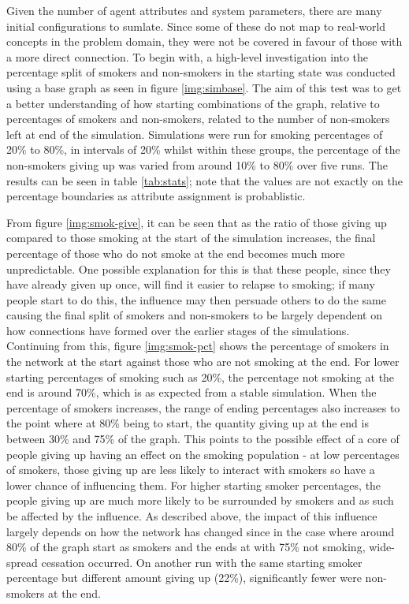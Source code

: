 \documentclass[]{report}
\begin{document}
Given the number of agent attributes and system parameters, there are many initial configurations to sumlate. Since some of these do not map to real-world concepts in the problem domain, they were not be covered in favour of those with a more direct connection. To begin with, a high-level investigation into the percentage split of smokers and non-smokers in the starting state was conducted using a base graph as seen in figure \ref{img:simbase}. The aim of this test was to get a better understanding of how starting combinations of the graph, relative to percentages of smokers and non-smokers, related to the number of non-smokers left at end of the simulation. Simulations were run for smoking percentages of 20\% to 80\%, in intervals of 20\% whilst within these groups, the percentage of the non-smokers giving up was varied from around 10\% to 80\% over five runs. The results can be seen in table \ref{tab:stats}; note that the values are not exactly on the percentage boundaries as attribute assignment is probablistic.


From figure \ref{img:smok-give}, it can be seen that as the ratio of those giving up compared to those smoking at the start of the simulation increases, the final percentage of those who do not smoke at the end becomes much more unpredictable. One possible explanation for this is that these people, since they have already given up once, will find it easier to relapse to smoking; if many people start to do this, the influence may then persuade others to do the same causing the final split of smokers and non-smokers to be largely dependent on how connections have formed over the earlier stages of the simulations. Continuing from this, figure \ref{img:smok-pct} shows the percentage of smokers in the network at the start against those who are not smoking at the end. For lower starting percentages of smoking such as 20\%, the percentage not smoking at the end is around 70\%, which is as expected from a stable simulation. When the percentage of smokers increases, the range of ending percentages also increases to the point where at 80\% being to start, the quantity giving up at the end is between 30\% and 75\% of the graph. This points to the possible effect of a core of people giving up having an effect on the smoking population - at low percentages of smokers, those giving up are less likely to interact with smokers so have a lower chance of influencing them. For higher starting smoker percentages, the people giving up are much more likely to be surrounded by smokers and as such be affected by the influence. As described above, the impact of this influence largely depends on how the network has changed since in the case where around 80\% of the graph start as smokers and the ends at with 75\% not smoking, wide-spread cessation occurred. On another run with the same starting smoker percentage but different amount giving up (22\%), significantly fewer were non-smokers at the end.
\end{document}
